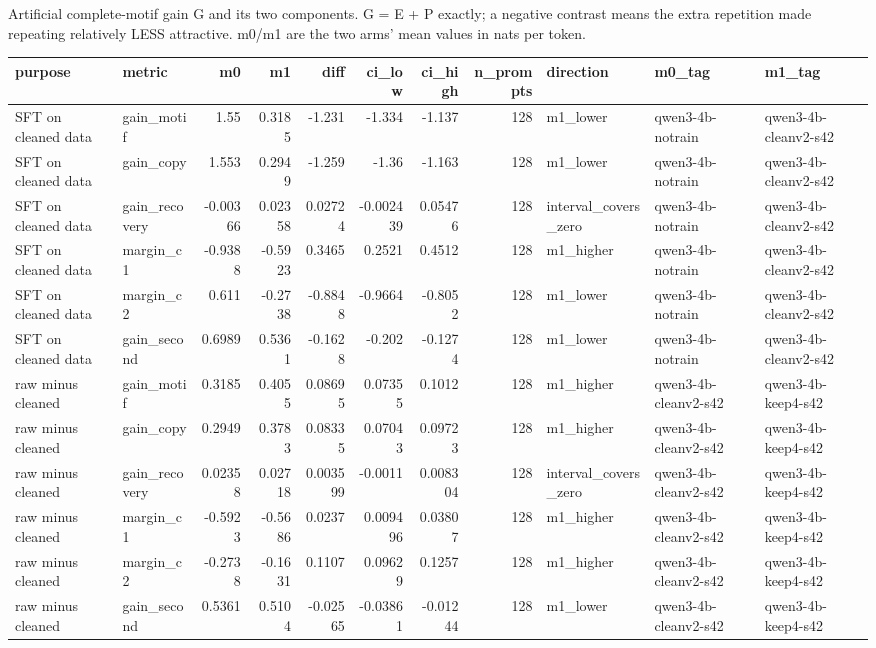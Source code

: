 \caption{Artificial complete-motif gain G and its two components. G = E + P exactly; a negative contrast means the extra repetition made repeating relatively LESS attractive. m0/m1 are the two arms' mean values in nats per token.}
\begin{tabular}{llrrrrrrlll}
\toprule
purpose & metric & m0 & m1 & diff & ci\_low & ci\_high & n\_prompts & direction & m0\_tag & m1\_tag \\
\midrule
SFT on cleaned data & gain\_motif & 1.55 & 0.3185 & -1.231 & -1.334 & -1.137 & 128 & m1\_lower & qwen3-4b-notrain & qwen3-4b-cleanv2-s42 \\
SFT on cleaned data & gain\_copy & 1.553 & 0.2949 & -1.259 & -1.36 & -1.163 & 128 & m1\_lower & qwen3-4b-notrain & qwen3-4b-cleanv2-s42 \\
SFT on cleaned data & gain\_recovery & -0.00366 & 0.02358 & 0.02724 & -0.002439 & 0.05476 & 128 & interval\_covers\_zero & qwen3-4b-notrain & qwen3-4b-cleanv2-s42 \\
SFT on cleaned data & margin\_c1 & -0.9388 & -0.5923 & 0.3465 & 0.2521 & 0.4512 & 128 & m1\_higher & qwen3-4b-notrain & qwen3-4b-cleanv2-s42 \\
SFT on cleaned data & margin\_c2 & 0.611 & -0.2738 & -0.8848 & -0.9664 & -0.8052 & 128 & m1\_lower & qwen3-4b-notrain & qwen3-4b-cleanv2-s42 \\
SFT on cleaned data & gain\_second & 0.6989 & 0.5361 & -0.1628 & -0.202 & -0.1274 & 128 & m1\_lower & qwen3-4b-notrain & qwen3-4b-cleanv2-s42 \\
raw minus cleaned & gain\_motif & 0.3185 & 0.4055 & 0.08695 & 0.07355 & 0.1012 & 128 & m1\_higher & qwen3-4b-cleanv2-s42 & qwen3-4b-keep4-s42 \\
raw minus cleaned & gain\_copy & 0.2949 & 0.3783 & 0.08335 & 0.07043 & 0.09723 & 128 & m1\_higher & qwen3-4b-cleanv2-s42 & qwen3-4b-keep4-s42 \\
raw minus cleaned & gain\_recovery & 0.02358 & 0.02718 & 0.003599 & -0.0011 & 0.008304 & 128 & interval\_covers\_zero & qwen3-4b-cleanv2-s42 & qwen3-4b-keep4-s42 \\
raw minus cleaned & margin\_c1 & -0.5923 & -0.5686 & 0.0237 & 0.009496 & 0.03807 & 128 & m1\_higher & qwen3-4b-cleanv2-s42 & qwen3-4b-keep4-s42 \\
raw minus cleaned & margin\_c2 & -0.2738 & -0.1631 & 0.1107 & 0.09629 & 0.1257 & 128 & m1\_higher & qwen3-4b-cleanv2-s42 & qwen3-4b-keep4-s42 \\
raw minus cleaned & gain\_second & 0.5361 & 0.5104 & -0.02565 & -0.03861 & -0.01244 & 128 & m1\_lower & qwen3-4b-cleanv2-s42 & qwen3-4b-keep4-s42 \\

\end{tabular}
